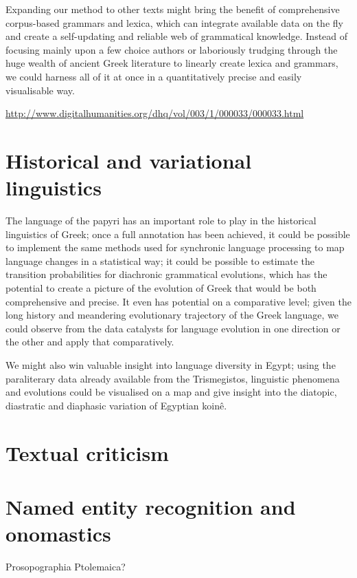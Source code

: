 Expanding our method to other texts might bring the benefit of comprehensive
corpus-based grammars and lexica, which can integrate available data on the fly
and create a self-updating and reliable web of grammatical knowledge. Instead
of focusing mainly upon a few choice authors or laboriously trudging through
the huge wealth of ancient Greek literature to linearly create lexica and
grammars, we could harness all of it at once in a quantitatively precise and
easily visualisable way.

\url{http://www.digitalhumanities.org/dhq/vol/003/1/000033/000033.html}


\section{Historical and variational linguistics} %
\label{sec:histlinguistics}

The language of the papyri has an important role to play in the historical
linguistics of Greek; once a full annotation has been achieved, it could be
possible to implement the same methods used for synchronic language processing
to map language changes in a statistical way; it could be possible to estimate
the transition probabilities for diachronic grammatical evolutions, which has
the potential to create a picture of the evolution of Greek that would be both
comprehensive and precise. It even has potential on a comparative level; given
the long history and meandering evolutionary trajectory of the Greek language,
we could observe from the data catalysts for language evolution in one
direction or the other and apply that comparatively.

We might also win valuable insight into language diversity in Egypt; using the
paraliterary data already available from the Trismegistos, linguistic phenomena
and evolutions could be visualised on a map and give insight into the diatopic,
diastratic and diaphasic variation of Egyptian koin\^e.



\section{Textual criticism} %
\label{sec:textualcriticism}



\section{Named entity recognition and onomastics} %
\label{sec:ner}

Prosopographia Ptolemaica?



